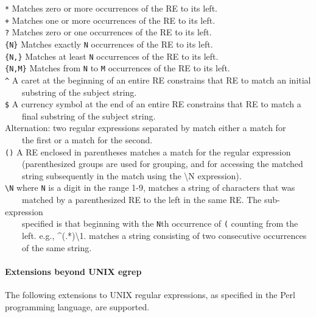 \texttt{*} Matches zero or more occurrences of the RE to its
left.\\
\texttt{+} Matches one or more occurrences of the RE to its
left.\\
\texttt{?} Matches zero or one occurrences of the RE to its
left.\\
\texttt{\{N\}} Matches exactly \texttt{N} occurrences of the RE to its
left.\\
\texttt{\{N,\}} Matches at least \texttt{N} occurrences of the RE to its
left.\\
\texttt{\{N,M\}} Matches from \texttt{N} to
\texttt{M} occurrences of the RE to its left.\\
\texttt{\^{}} A caret at the beginning of an entire RE constrains that
RE to match an initial\\
 \ \ \ \ substring of the subject string.\\
\texttt{\$} A currency symbol at the end of an entire RE constrains that
RE to match a\\
 \ \ \ \ final substring of the subject string.\\
\texttt{{\textbar}} Alternation: two regular expressions separated by
\texttt{{\textquotedbl}{\textbar}{\textquotedbl}} match either a match
for\\
 \ \ \ \ the first or a match for the second.\\
\texttt{()} A RE enclosed in parentheses matches a match for the regular
expression\\
 \ \ \ \ (parenthesized groups are used for grouping, and for accessing
the matched\\
 \ \ \ \ string subsequently in the match using the {\textbackslash}N
expression).\\
\texttt{{\textbackslash}N} where \texttt{N} is a digit in the range 1-9,
matches a string of characters that was\\
 \ \ \ \ matched by a parenthesized RE to the left in the same RE. The
sub-expression\\
 \ \ \ \ specified is that beginning with the \texttt{N}th occurrence of
\texttt{{\textquotedbl}({\textquotedbl}} counting from the
\\
 \ \ \ \ left. e.g., \^{}(.*){\textbackslash}1. matches a string consisting of
two consecutive occurrences\\
 \ \ \ \ of the same string.

\paragraph{Extensions beyond UNIX egrep}
The following extensions to UNIX regular expressions, as specified in
the Perl programming language, are supported.


